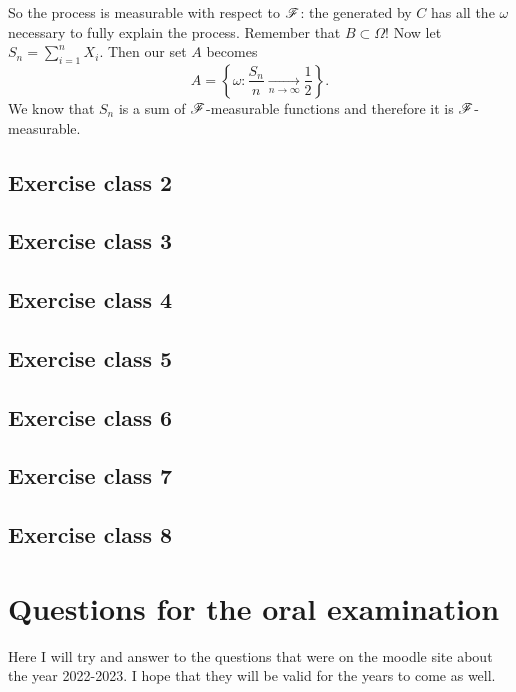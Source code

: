 \documentclass{report}
\begin{document}
So the process is measurable with respect to $\mathscr{F}$: the \sa{} generated by $C$ has all the $\omega$ necessary to fully explain the process. Remember that $B\subset\Omega$! Now let $S_n=\sum_{i=1}^{n}X_i$. Then our set $A$ becomes
\begin{equation*}
	A=\left\{\omega:\frac{S_n}{n}\xrightarrow[n\to\infty]{}\frac{1}{2}\right\}.
\end{equation*}We know that $S_n$ is a sum of $\mathscr{F}$-measurable functions and therefore it is $\mathscr{F}$-measurable.
\subsection{Exercise class 2}
\subsection{Exercise class 3}
\subsection{Exercise class 4}
\subsection{Exercise class 5}
\subsection{Exercise class 6}
\subsection{Exercise class 7}
\subsection{Exercise class 8}
\section{Questions for the oral examination}
Here I will try and answer to the questions that were on the moodle site about the year 2022-2023. I hope that they will be valid for the years to come as well.
\end{document}
